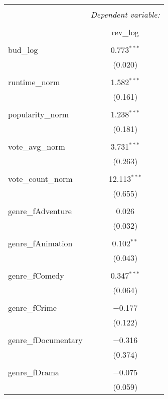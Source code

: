 
\begin{table}[!htbp] \centering 
  \caption{} 
  \label{} 
\begin{tabular}{@{\extracolsep{5pt}}lc} 
\\[-1.8ex]\hline 
\hline \\[-1.8ex] 
 & \multicolumn{1}{c}{\textit{Dependent variable:}} \\ 
\cline{2-2} 
\\[-1.8ex] & rev\_log \\ 
\hline \\[-1.8ex] 
 bud\_log & 0.773$^{***}$ \\ 
  & (0.020) \\ 
  & \\ 
 runtime\_norm & 1.582$^{***}$ \\ 
  & (0.161) \\ 
  & \\ 
 popularity\_norm & 1.238$^{***}$ \\ 
  & (0.181) \\ 
  & \\ 
 vote\_avg\_norm & 3.731$^{***}$ \\ 
  & (0.263) \\ 
  & \\ 
 vote\_count\_norm & 12.113$^{***}$ \\ 
  & (0.655) \\ 
  & \\ 
 genre\_fAdventure & 0.026 \\ 
  & (0.032) \\ 
  & \\ 
 genre\_fAnimation & 0.102$^{**}$ \\ 
  & (0.043) \\ 
  & \\ 
 genre\_fComedy & 0.347$^{***}$ \\ 
  & (0.064) \\ 
  & \\ 
 genre\_fCrime & $-$0.177 \\ 
  & (0.122) \\ 
  & \\ 
 genre\_fDocumentary & $-$0.316 \\ 
  & (0.374) \\ 
  & \\ 
 genre\_fDrama & $-$0.075 \\ 
  & (0.059) \\ 

\end{tabular}
\end{table}

